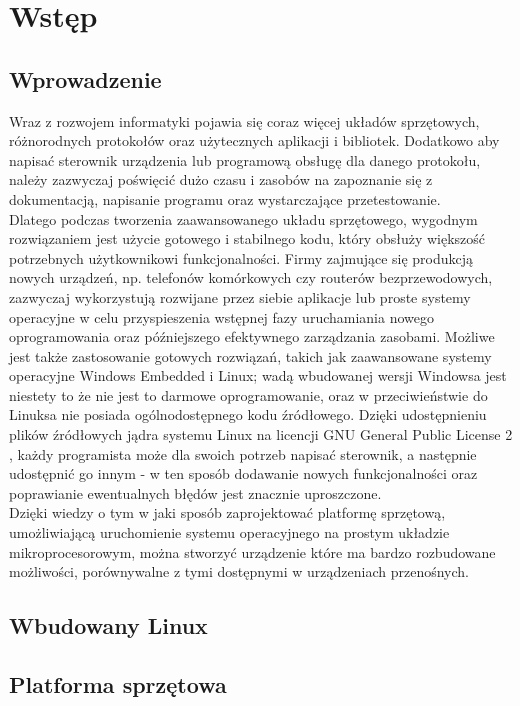 \documentclass[a4paper,12pt]{book}
\begin{document}
	\tableofcontents

	\chapter{Wstęp}
		\section{Wprowadzenie}
			Wraz z rozwojem informatyki pojawia się coraz więcej układów sprzętowych, różnorodnych protokołów oraz użytecznych aplikacji i bibliotek. Dodatkowo aby napisać sterownik urządzenia lub programową obsługę dla danego protokołu, należy zazwyczaj poświęcić dużo czasu i zasobów na zapoznanie się z dokumentacją, napisanie programu oraz wystarczające przetestowanie.\\
			Dlatego podczas tworzenia zaawansowanego układu sprzętowego, wygodnym rozwiązaniem jest użycie gotowego i stabilnego kodu, który obsłuży większość potrzebnych użytkownikowi funkcjonalności. Firmy zajmujące się produkcją nowych urządzeń, np. telefonów komórkowych czy routerów bezprzewodowych, zazwyczaj wykorzystują rozwijane przez siebie aplikacje lub proste systemy operacyjne w celu przyspieszenia wstępnej fazy uruchamiania nowego oprogramowania oraz późniejszego efektywnego zarządzania zasobami. Możliwe jest także zastosowanie gotowych rozwiązań, takich jak zaawansowane systemy operacyjne Windows Embedded i Linux; wadą wbudowanej wersji Windowsa jest niestety to że nie jest to darmowe oprogramowanie, oraz w przeciwieństwie do Linuksa nie posiada ogólnodostępnego kodu źródłowego. Dzięki udostępnieniu plików źródłowych jądra systemu Linux na licencji GNU General Public License 2 \cite{gnu_gpl_v2}, każdy programista może dla swoich potrzeb napisać sterownik, a następnie udostępnić go innym - w ten sposób dodawanie nowych funkcjonalności oraz poprawianie ewentualnych błędów jest znacznie uproszczone.\\
			Dzięki wiedzy o tym w jaki sposób zaprojektować platformę sprzętową, umożliwiającą uruchomienie systemu operacyjnego na prostym układzie mikroprocesorowym, można stworzyć urządzenie które ma bardzo rozbudowane możliwości, porównywalne z tymi dostępnymi w urządzeniach przenośnych.
		\section{Wbudowany Linux}
		\section{Platforma sprzętowa}
\end{document}
